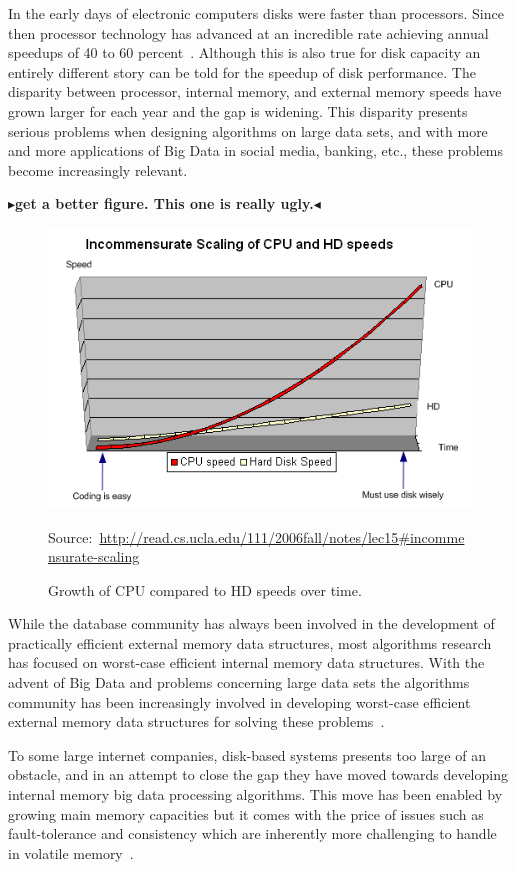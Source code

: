 \documentclass[twoside,11pt,openright]{report}
\newcommand{\todo}[1]{{\color[rgb]{.5,0,0}\textbf{$\blacktriangleright$#1$\blacktriangleleft$}}}
\begin{document}
In the early days of electronic computers disks were faster than processors. Since then processor technology has advanced at an incredible rate achieving annual speedups of 40 to 60 percent~\cite{ruemmler_wilkes_1994}. Although this is also true for disk capacity an entirely different story can be told for the speedup of disk performance. The disparity between processor, internal memory, and external memory speeds have grown larger for each year and the gap is widening. This disparity presents serious problems when designing algorithms on large data sets, and with more and more applications of Big Data in social media, banking, etc., these problems become increasingly relevant.

\todo{get a better figure. This one is really ugly.}
\begin{figure}[h]
	\centering
		\includegraphics[scale=0.5]{../figures/scaling-of-cpu-vs-disk}
	\caption{Growth of CPU compared to HD speeds over time.}
	\tiny{Source:~\protect\url{http://read.cs.ucla.edu/111/2006fall/notes/lec15\#incommensurate-scaling}}
	\label{fig:cpu_vs_disk}
\end{figure}

While the database community has always been involved in the development of practically efficient external memory data structures, most algorithms research has focused on worst-case efficient internal memory data structures. With the advent of Big Data and problems concerning large data sets the algorithms community has been increasingly involved in developing worst-case efficient external memory data structures for solving these problems~\cite{ionote}.

To some large internet companies, disk-based systems presents too large of an obstacle, and in an attempt to close the gap they have moved towards developing internal memory big data processing algorithms. This move has been enabled by growing main memory capacities but it comes with the price of issues such as fault-tolerance and consistency which are inherently more challenging to handle in volatile memory~\cite{Zhang2015}.
\end{document}
